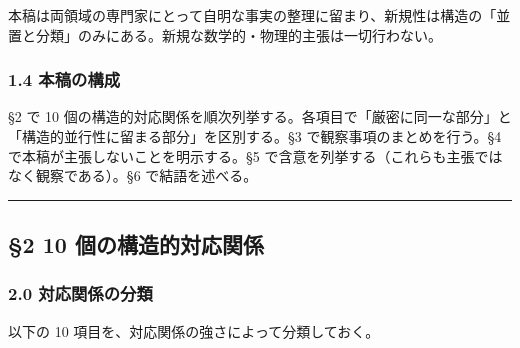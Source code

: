 \documentclass[
]{ltjsarticle}
\begin{document}
本稿は両領域の専門家にとって自明な事実の整理に留まり、新規性は構造の「並置と分類」のみにある。新規な数学的・物理的主張は一切行わない。

\subsubsection{1.4 本稿の構成}\label{ux672cux7a3fux306eux69cbux6210}

§2 で 10
個の構造的対応関係を順次列挙する。各項目で「厳密に同一な部分」と「構造的並行性に留まる部分」を区別する。§3
で観察事項のまとめを行う。§4 で本稿が主張しないことを明示する。§5
で含意を列挙する（これらも主張ではなく観察である）。§6 で結語を述べる。

\begin{center}\rule{0.5\linewidth}{0.5pt}\end{center}

\subsection{§2 10
個の構造的対応関係}\label{ux500bux306eux69cbux9020ux7684ux5bfeux5fdcux95a2ux4fc2}

\subsubsection{2.0
対応関係の分類}\label{ux5bfeux5fdcux95a2ux4fc2ux306eux5206ux985e}

以下の 10 項目を、対応関係の強さによって分類しておく。
\end{document}

